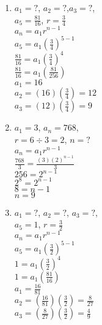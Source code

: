 \begin{enumerate}[label = \Alph*. ]
\begin{multicols}{2}
\begin{enumerate}[label = \arabic*. ]
	\item %
$a_1=? $, $a_2=?$,$a_3=?$,\\
$ a_5=\displaystyle\frac{81}{16}$,
$r=\displaystyle \frac{3}{4}$\\
$a_n=a_1r^{n-1}$\\	 
$a_5=a_1\left( \displaystyle \frac{3}{4}\right) ^{5-1}$\\	 
$\displaystyle\frac{81}{16}=a_1\left( \displaystyle \frac{3}{4}\right)^{4}$\\	 
$\displaystyle\frac{81}{16}=a_1\left( \displaystyle \frac{81}{256}\right)$\\
$a_1=16$\\
$a_2=(16)\left( \displaystyle \frac{3}{4}\right)=12 $\\
$a_3=(12)\left( \displaystyle \frac{3}{4}\right)=9 $

	\item %
$a_1=3$, $a_n=768$,\\
$r=6\div 3=2$, $n=? $\\
$a_n=a_1r^{n-1}$\\	 
$\displaystyle \frac{768}{3} =\displaystyle \frac{(3)(2)^{n-1}}{3} $\\	 
$256=2^{n-1}$\\
$2^{8}=2^{n-1}$\\
$8=n-1$\\
$n=9$
 
	\item %
$a_1=? $, $a_2=? $, $a_3=? $,\\
$a_5=1$, $r=\displaystyle \frac{3}{2}$\\
$a_n=a_1r^{n-1}$\\	
$a_5=a_1\left(\displaystyle \frac{3}{2} \right)^{5-1}$\\	
$1=a_1\left(\displaystyle \frac{3}{2} \right)^{4}$\\	
$1=a_1\left(\displaystyle \frac{81}{16} \right)$\\	
$a_1=\displaystyle \frac{16}{81}$\\
$a_2=\left( \displaystyle \frac{16}{81}\right)\left( \displaystyle \frac{3}{2}\right) =\displaystyle \frac{8}{27} $\\

$a_3=\left( \displaystyle \frac{8}{27}\right)\left( \displaystyle \frac{3}{2}\right) =\displaystyle \frac{4}{9}   $


	\end{enumerate}
	\end{multicols} 
\end{enumerate}